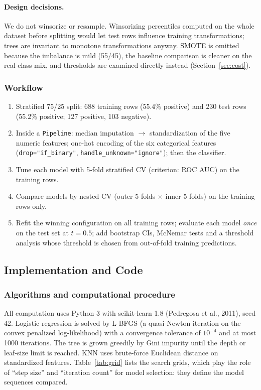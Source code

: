 \documentclass[12pt,a4paper]{article}
\newcommand{\code}[1]{\texttt{\small #1}}
\begin{document}
\paragraph{Design decisions.} We do not winsorize or resample. Winsorizing percentiles computed on the whole dataset before splitting would let test rows influence training transformations; trees are invariant to monotone transformations anyway. SMOTE is omitted because the imbalance is mild (55/45), the baseline comparison is cleaner on the real class mix, and thresholds are examined directly instead (Section~\ref{sec:cost}).

\subsubsection{Workflow}
\begin{enumerate}[label=\arabic*.,itemsep=0pt]
  \item Stratified 75/25 split: 688 training rows (55.4\% positive) and 230 test rows (55.2\% positive; 127 positive, 103 negative).
  \item Inside a \code{Pipeline}: median imputation $\rightarrow$ standardization of the five numeric features; one-hot encoding of the six categorical features (\texttt{\small drop="if\_binary"}, \texttt{\small handle\_unknown="ignore"}); then the classifier.
  \item Tune each model with 5-fold stratified CV (criterion: ROC AUC) on the training rows.
  \item Compare models by nested CV (outer 5 folds $\times$ inner 5 folds) on the training rows only.
  \item Refit the winning configuration on all training rows; evaluate each model \emph{once} on the test set at $t=0.5$; add bootstrap CIs, McNemar tests and a threshold analysis whose threshold is chosen from out-of-fold training predictions.
\end{enumerate}

\subsection{Implementation and Code}
\subsubsection{Algorithms and computational procedure}
All computation uses Python 3 with scikit-learn 1.8 (Pedregosa et al., 2011), seed 42. Logistic regression is solved by L-BFGS (a quasi-Newton iteration on the convex penalized log-likelihood) with a convergence tolerance of $10^{-4}$ and at most 1000 iterations. The tree is grown greedily by Gini impurity until the depth or leaf-size limit is reached. KNN uses brute-force Euclidean distance on standardized features. Table~\ref{tab:grid} lists the search grids, which play the role of ``step size'' and ``iteration count'' for model selection: they define the model sequences compared.
\end{document}
